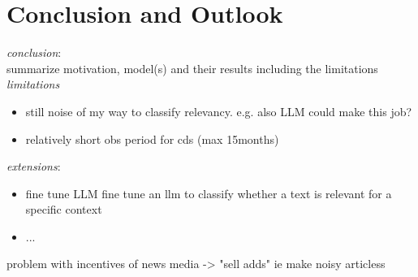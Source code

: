 \chapter{Conclusion and Outlook}\label{sec6}
\thispagestyle{empty}

\textit{conclusion}: \\
summarize motivation, model(s) and their results including the limitations \\

\noindent
\textit{limitations}
\begin{itemize}
	\item still noise of my way to classify relevancy. e.g. also LLM could make this job?
	\item relatively short obs period for cds (max 15months)
\end{itemize}

\noindent
\textit{extensions}:
\begin{itemize}
	\item fine tune LLM fine tune an llm to classify whether a text is relevant for a specific context
	\item ...
\end{itemize}

problem with incentives of news media -> "sell adds" ie make noisy articless




\cleardoublepage
